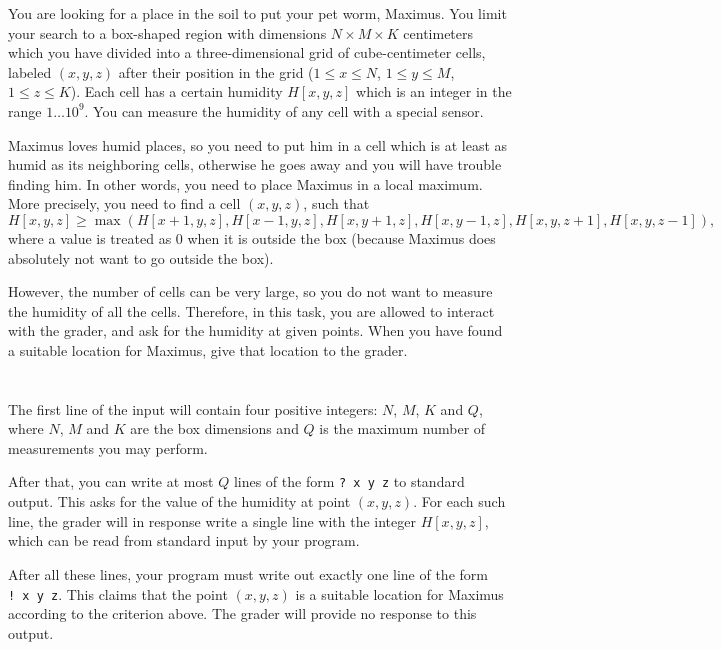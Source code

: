 \ifx\boi\undefined\fi
\def\version{jury-1}

You are looking for a place in the soil to put your pet worm, Maximus. You limit your search to a box-shaped region with dimensions $N \times M \times K$ centimeters which you have divided into a three-dimensional grid of cube-centimeter cells, labeled $(x,y,z)$ after their position in the grid ($1 \le x \le N$, $1 \le y \le M$, $1 \le z \le K$). Each cell has a certain humidity $H[x,y,z]$ which is an integer in the range $1 \dots 10^9$. You can measure the humidity of any cell with a special sensor.

Maximus loves humid places, so you need to put him in a cell which is at least as humid as its neighboring cells, otherwise he goes away and you will have trouble finding him.
In other words, you need to place Maximus in a local maximum.
More precisely, you need to find a cell $(x,y,z)$, such that
$$
H[x,y,z] \ge \max(H[x+1,y,z], H[x-1,y,z], H[x,y+1,z], H[x,y-1,z], H[x,y,z+1], H[x,y,z-1]),
$$
where a value is treated as $0$ when it is outside the box (because Maximus does absolutely not want to go outside the box).

However, the number of cells can be very large, so you do not want to measure the humidity of all the cells. Therefore, in this task, you are allowed to interact with the grader, and ask for the humidity at given points.
When you have found a suitable location for Maximus, give that location to the grader.

\section*{\interactivity}
The first line of the input will contain four positive integers: $N$, $M$, $K$ and $Q$, where $N$, $M$ and $K$ are the box dimensions and $Q$ is the maximum number of measurements you may perform.

After that, you can write at most $Q$ lines of the form \texttt{?\ x y z} to standard output.
This asks for the value of the humidity at point $(x, y, z)$.
For each such line, the grader will in response write a single line with the integer $H[x,y,z]$, which can be read from standard input by your program.

After all these lines, your program must write out exactly one line of the form \texttt{!\ x y z}.
This claims that the point $(x, y, z)$ is a suitable location for Maximus according to the criterion above.
The grader will provide no response to this output.

